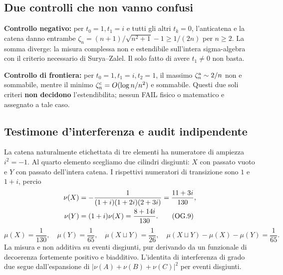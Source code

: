\documentclass[11pt,a4paper]{article}
\begin{document}
\subsection*{Due controlli che non vanno confusi}
\textbf{Controllo negativo:} per $t_0=1,t_1=i$ e tutti gli altri $t_k=0$, l'anticatena e la catena danno entrambe $\zeta_n=(n+1)/\sqrt{n^2+1}-1\ge 1/(2n)$ per $n\ge2$. La somma diverge: la misura complessa non e estendibile sull'intera sigma-algebra con il criterio necessario di Surya--Zalel. Il solo fatto di avere $t_1\ne0$ non basta.

\textbf{Controllo di frontiera:} per $t_0=1,t_1=i,t_2=1$, il massimo $\zeta_n^{\rm a}\sim2/n$ non e sommabile, mentre il minimo $\zeta_n^{\rm c}=O(\log n/n^2)$ e sommabile. Questi due soli criteri \textbf{non decidono} l'estendibilita; nessun FAIL fisico o matematico e assegnato a tale caso.

\clearpage
\subsection*{Testimone d'interferenza e audit indipendente}
La catena naturalmente etichettata di tre elementi ha numeratore di ampiezza $i^2=-1$. Al quarto elemento scegliamo due cilindri disgiunti: $X$ con passato vuoto e $Y$ con passato dell'intera catena. I rispettivi numeratori di transizione sono $1$ e $1+i$, percio
\begin{align}
 \nu(X)&=-\frac1{(1+i)(1+2i)(2+3i)}=\frac{11+3i}{130},\notag\\
 \nu(Y)&=(1+i)\nu(X)=\frac{8+14i}{130}.\tag{OG.9}
\end{align}
\begin{equation}
\boxed{\mu(X)=\frac1{130},\quad \mu(Y)=\frac1{65},\quad
\mu(X\sqcup Y)=\frac1{26},\quad
\mu(X\sqcup Y)-\mu(X)-\mu(Y)=\frac1{65}.}\tag{OG.10}
\end{equation}
La misura e non additiva su eventi disgiunti, pur derivando da un funzionale di decoerenza fortemente positivo e biadditivo. L'identita di interferenza di grado due segue dall'espansione di $|\nu(A)+\nu(B)+\nu(C)|^2$ per eventi disgiunti.
\end{document}
